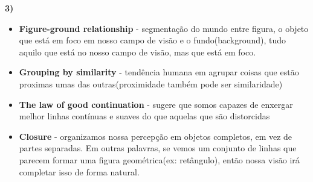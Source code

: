 \textbf{3)} 

\begin{itemize}
	\item \textbf{Figure-ground relationship} - segmentação do mundo entre 
	figura, o objeto que está em foco em nosso campo de visão e o fundo(background),
	tudo aquilo que está no nosso campo de visão, mas que está em foco.
	\item \textbf{Grouping by similarity} - tendência humana em agrupar coisas que 
	estão proximas umas das outras(proximidade também pode ser similaridade)
	\item \textbf{The law of good continuation} - sugere que somos capazes 
	de enxergar melhor linhas contínuas e suaves do que aquelas que são distorcidas
	\item \textbf{Closure} - organizamos nossa percepção em objetos completos, em 
	vez de partes separadas. Em outras palavras, se vemos um conjunto de linhas 
	que parecem formar uma figura geométrica(ex: retângulo), então nossa visão irá 
	completar isso de forma natural.
\end{itemize}